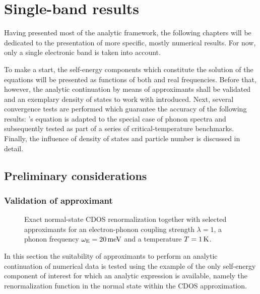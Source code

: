 
\chapter{Single-band results}
\label{single-band results}

Having presented most of the analytic framework, the following chapters will be
dedicated to the presentation of more specific, mostly numerical results. For
now, only a single electronic band is taken into account.

To make a start, the self-energy components which constitute the solution of the
 equations will be presented as functions of both
 and real frequencies. Before that, however, the analytic
continuation by means of  approximants shall be validated and an
exemplary density of states to work with introduced. Next, several convergence
tests are performed which guarantee the accuracy of the following results:
's equation is adapted to the special case of 
phonon spectra and subsequently tested as part of a series of
critical-temperature benchmarks. Finally, the influence of density of states and
particle number is discussed in detail.

\section{Preliminary considerations}

\subsection{Validation of  approximant}

\begin{figure}
    
    
    \caption[Exact normal-state CDOS renormalization on both complex axes]{
        Exact normal-state CDOS renormalization together with selected
         approximants for an electron-phonon coupling strength
        $\lambda = 1$, a phonon frequency $\omega \sb{\text{E}} = 20\,\mathrm{meV}$ and a
        temperature $T = 1\,\mathrm K$.}
    \label{validation Pade}
\end{figure}
%
In this section the suitability of  approximants to perform an
analytic continuation of numerical data is tested using the example of the only
self-energy component of interest for which an analytic expression is available,
namely the renormalization function in the normal state within the CDOS
approximation.


